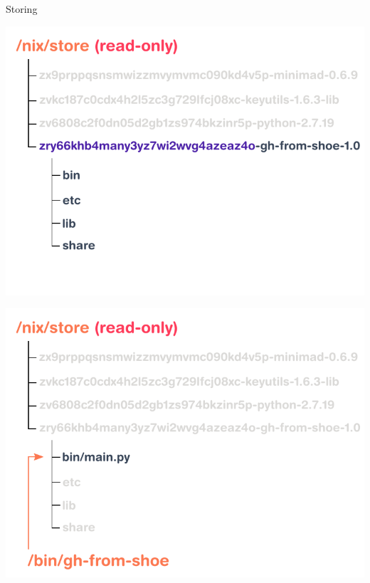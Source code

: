\documentclass[aspectratio=169]{beamer}
\begin{document}
\begin{frame}{Storing}
     {
\begin{center}
    \includegraphics[height=0.98\textheight]{img/schema-nix-store.pdf}
\end{center}
 }
     {
\begin{center}
    \includegraphics[height=0.98\textheight]{img/schema-nix-store-link.pdf}
\end{center}
}
\end{frame}

\end{document}
